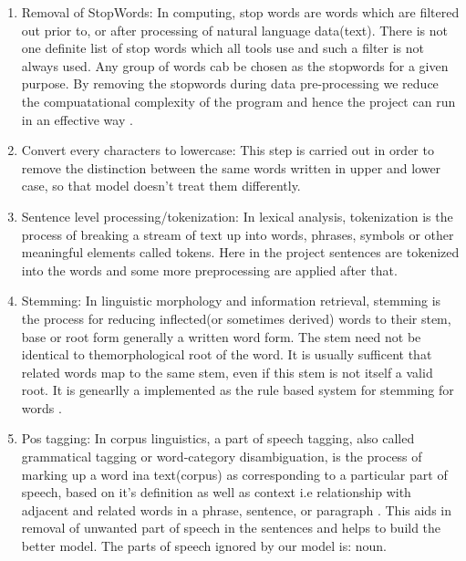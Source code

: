 \begin{enumerate}
\item Removal of StopWords:
In computing, stop words are words which are filtered out prior to, or after processing of natural language data(text). There is not one definite list of stop words which all tools use and such a filter is not always used. Any group of words cab be chosen as the stopwords for a given purpose. By removing the stopwords during data pre-processing we reduce the compuatational complexity of the program and hence the project can run in an effective way \cite{stopwords}.
\item Convert every characters to lowercase:
This step is carried out in order to remove the distinction between the same words written in upper and lower case, so that model doesn't treat them differently.
\item Sentence level processing/tokenization:
In lexical analysis, tokenization is the process of breaking a stream of text up into words, phrases, symbols or other meaningful elements called tokens. Here in the project sentences are tokenized into the words and some more preprocessing are applied after that.
\item Stemming:
In linguistic morphology and information retrieval, stemming is the process for reducing inflected(or sometimes derived) words to their stem, base or root form generally a written word form. The stem need not be identical to themorphological root of the word. It is usually sufficent that related words map to the same stem, even if this stem is not itself a valid root. It is genearlly a implemented as the rule based system for stemming for words \cite{porter}.
\item Pos tagging:
In corpus linguistics, a part of speech tagging, also called grammatical tagging or word-category disambiguation, is the process of marking up a word ina text(corpus) as corresponding to a particular part of speech, based on it's definition as well as context i.e relationship with adjacent and related words in a phrase, sentence, or paragraph \cite{pos}. This aids in removal of unwanted part of speech in the sentences and helps to build the better model. The parts of speech ignored by our model is: noun.
\end{enumerate}

